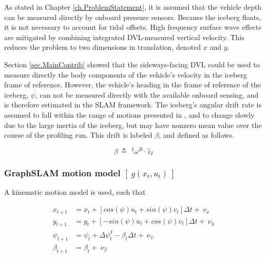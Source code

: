 As stated in Chapter \ref{ch.ProblemStatement}, it is assumed that the vehicle depth can be measured directly by onboard pressure sensors. Because the iceberg floats, it is not necessary to account for tidal offsets. High frequency surface wave effects are mitigated by combining integrated DVL-measured vertical velocity. This reduces the problem to two dimensions in translation, denoted $x$ and $y$. 


Section \ref{sec.MainContrib} showed that the sideways-facing DVL could be used to measure directly the body components of the vehicle's velocity in the iceberg frame of reference. However, the vehicle's heading in the frame of reference of the iceberg, $\psi$, can not be measured directly with the available onboard sensing, and is therefore estimated in the SLAM framework. The iceberg's angular drift rate is assumed to fall within the range of motions presented in  \cite{Gladstone2002,Wadhams1983}, and to change slowly due to the large inertia of the iceberg, but may have nonzero mean value over the course of the profiling run. This drift is labeled $\beta$, and defined as follows.

\begin{equation}
\beta \, \triangleq \, ~^I\omega^B\cdot\hat{z}_I
\end{equation} 

\subsubsection{GraphSLAM motion model $\left[~g\left(x_t,u_t\right)~\right]$ }

A kinematic motion model is used, such that

\begin{align}
x_{t+1} &= x_t + \left[cos(\psi) u_t + sin(\psi)v_t\right]\Delta t +~ \nu_x\\
y_{t+1} &= y_t + \left[-sin(\psi) u_t + cos(\psi)v_t\right]\Delta t + ~\nu_y \\
\psi_{t+1}    &= \psi_{t} + \Delta\psi_t^I - \beta_t\Delta t + ~\nu_\psi \\
\beta_{t +1}   &= \beta_{t} + ~\nu_\beta
\end{align}


